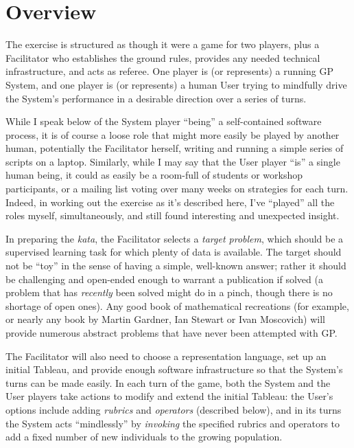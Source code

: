 \section{Overview}\hypertarget{overview}{}\label{overview}

The exercise is structured as though it were a game for two players, plus a Facilitator who establishes the ground rules, provides any needed technical infrastructure, and acts as referee. One player is (or represents) a running GP System, and one player is (or represents) a human User trying to mindfully drive the System's performance in a desirable direction over a series of turns.

While I speak below of the System player ``being'' a self-contained software process, it is of course a loose role that might more easily be played by another human, potentially the Facilitator herself, writing and running a simple series of scripts on a laptop. Similarly, while I may say that the User player ``is'' a single human being, it could as easily be a room-full of students or workshop participants, or a mailing list voting over many weeks on strategies for each turn. Indeed, in working out the exercise as it's described here, I've ``played'' all the roles myself, simultaneously, and still found interesting and unexpected insight.

In preparing the \emph{kata}, the Facilitator selects a \emph{target problem}, which should be a supervised learning task for which plenty of data is available. The target should not be ``toy'' in the sense of having a simple, well-known answer; rather it should be challenging and open-ended enough to warrant a publication if solved (a problem that has \emph{recently} been solved might do in a pinch, though there is no shortage of open ones). Any good book of mathematical recreations (for example, \citep{Winkler:2003} or nearly any book by Martin Gardner, Ian Stewart or Ivan Moscovich) will provide numerous abstract problems that have never been attempted with GP.

The Facilitator will also need to choose a representation language, set up an initial Tableau, and provide enough software infrastructure so that the System's turns can be made easily. In each turn of the game, both the System and the User players take actions to modify and extend the initial Tableau: the User's options include adding \emph{rubrics} and \emph{operators} (described below), and in its turns the System acts ``mindlessly'' by \emph{invoking} the specified rubrics and operators to add a fixed number of new individuals to the growing population.

